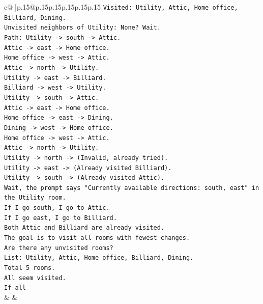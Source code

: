 \documentclass{article}
\begin{document}
{\begin{supertabular}{c@{$\;$}|p{.15\linewidth}@{}p{.15\linewidth}p{.15\linewidth}p{.15\linewidth}p{.15\linewidth}p{.15\linewidth}}
{{{\texttt{Visited: Utility, Attic, Home office, Billiard, Dining.} \\
\texttt{Unvisited neighbors of Utility: None? Wait.} \\
\texttt{Path: Utility {-}> south {-}> Attic.} \\
\texttt{Attic {-}> east {-}> Home office.} \\
\texttt{Home office {-}> west {-}> Attic.} \\
\texttt{Attic {-}> north {-}> Utility.} \\
\texttt{Utility {-}> east {-}> Billiard.} \\
\texttt{Billiard {-}> west {-}> Utility.} \\
\texttt{Utility {-}> south {-}> Attic.} \\
\texttt{Attic {-}> east {-}> Home office.} \\
\texttt{Home office {-}> east {-}> Dining.} \\
\texttt{Dining {-}> west {-}> Home office.} \\
\texttt{Home office {-}> west {-}> Attic.} \\
\texttt{Attic {-}> north {-}> Utility.} \\
\texttt{Utility {-}> north {-}> (Invalid, already tried).} \\
\texttt{Utility {-}> east {-}> (Already visited Billiard).} \\
\texttt{Utility {-}> south {-}> (Already visited Attic).} \\
\texttt{Wait, the prompt says "Currently available directions: south, east" in the Utility room.} \\
\texttt{If I go south, I go to Attic.} \\
\texttt{If I go east, I go to Billiard.} \\
\texttt{Both Attic and Billiard are already visited.} \\
\texttt{The goal is to visit all rooms with fewest changes.} \\
\texttt{Are there any unvisited rooms?} \\
\texttt{List: Utility, Attic, Home office, Billiard, Dining.} \\
\texttt{Total 5 rooms.} \\
\texttt{All seem visited.} \\
\texttt{If all} \\
            }
        }
    }
    & & \\ \\


\end{supertabular}}
\end{document}

